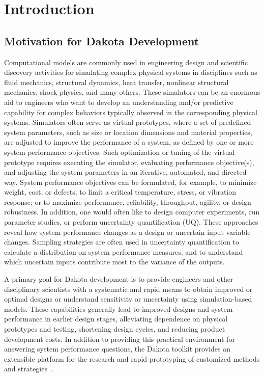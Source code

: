 \chapter{Introduction}\label{intro}

\section{Motivation for Dakota Development}\label{intro:motivation}

Computational models are commonly used in engineering design and
scientific discovery activities for simulating complex physical
systems in disciplines such as fluid mechanics, structural dynamics,
heat transfer, nonlinear structural mechanics, shock physics, and many
others. These simulators can be an enormous aid to engineers who want
to develop an understanding and/or predictive capability for complex
behaviors typically observed in the corresponding physical
systems. Simulators often serve as virtual prototypes, where a set of
predefined system parameters, such as size or location dimensions and
material properties, are adjusted to improve the performance of a
system, as defined by one or more system performance objectives. Such
optimization or tuning of the virtual prototype requires executing the
simulator, evaluating performance objective(s), and adjusting the
system parameters in an iterative, automated, and directed way. System
performance objectives can be formulated, for example, to minimize
weight, cost, or defects; to limit a critical temperature, stress, or
vibration response; or to maximize performance, reliability,
throughput, agility, or design robustness.  In addition, one would
often like to design computer experiments, run parameter studies, or
perform uncertainty quantification (UQ). These approaches reveal how
system performance changes as a design or uncertain input variable
changes.  Sampling strategies are often used in uncertainty
quantification to calculate a distribution on system performance
measures, and to understand which uncertain inputs contribute most to
the variance of the outputs.

A primary goal for Dakota development is to provide engineers and
other disciplinary scientists with a systematic and rapid means to
obtain improved or optimal designs or understand sensitivity or
uncertainty using simulation-based models. These capabilities
generally lead to improved designs and system performance in earlier
design stages, alleviating dependence on physical prototypes and
testing, shortening design cycles, and reducing product development
costs. In addition to providing this practical environment for
answering system performance questions, the Dakota toolkit provides an
extensible platform for the research and rapid prototyping of
customized methods and strategies~\cite{Eld98b}.

